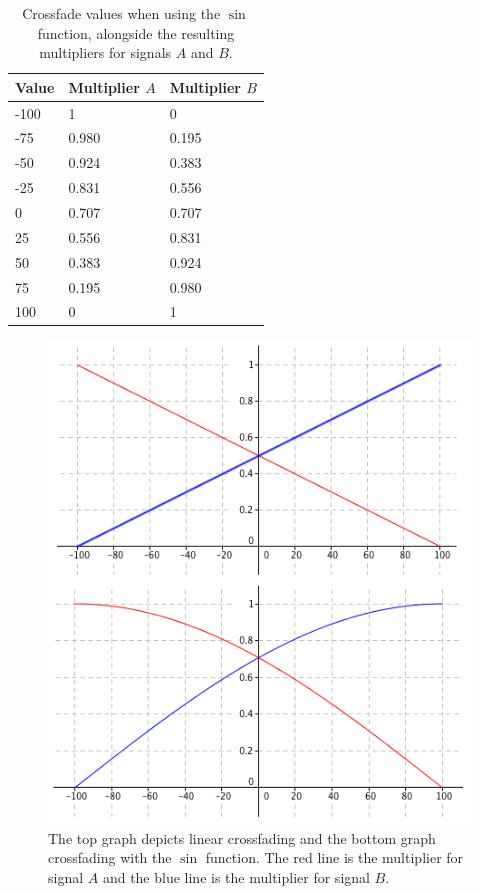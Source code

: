 \begin{table}[h!]

  \centering

  \begin{tabular}[]{| l | l | l |}
    \hline
    \rowcolor[gray]{0.8}
    Value & Multiplier $A$ & Multiplier $B$ \\\hline
    -100 & 1 & 0\\\hline
    -75 & 0.980 & 0.195\\\hline
    -50 & 0.924 & 0.383\\\hline
    -25 & 0.831 & 0.556\\\hline
    0 & 0.707 & 0.707\\\hline
    25 & 0.556 & 0.831\\\hline
    50 & 0.383 & 0.924\\\hline
    75 & 0.195 & 0.980\\\hline
    100 & 0 & 1\\
    \hline
  \end{tabular}

  \caption{Crossfade values when using the $\sin$ function, alongside the resulting multipliers for signals $A$ and $B$.}

  \label{tb:scrossfade}

\end{table}

\begin{figure}[p!]

  \includegraphics[scale=0.7]{img/lscrossfade}

  \caption{The top graph depicts linear crossfading and the bottom graph crossfading with the $\sin$ function. The red line is the multiplier for signal $A$ and the blue line is the multiplier for signal $B$.}

  \label{fig:lscrossfade}

\end{figure}

